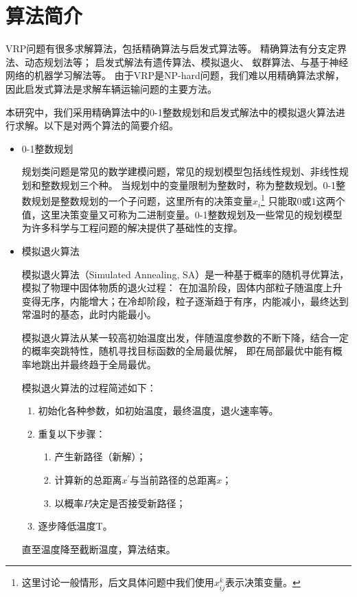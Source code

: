 \section{算法简介}
VRP问题有很多求解算法，包括精确算法与启发式算法等。
精确算法有分支定界法、动态规划法\cite{kara2003integer}等；
启发式解法有遗传算法\cite{baker2003genetic}、模拟退火\cite{vincent2017simulated}、
蚁群算法、与基于神经网络的机器学习解法\cite{bi2022learning}等。
由于VRP是NP-hard问题，我们难以用精确算法求解，因此启发式算法是求解车辆运输问题的主要方法。

本研究中，我们采用精确算法中的0-1整数规划和启发式解法中的模拟退火算法进行求解。以下是对两个算法的简要介绍。

\begin{itemize}
    \item 0-1整数规划

    规划类问题是常见的数学建模问题，常见的规划模型包括线性规划、非线性规划和整数规划三个种。
    当规划中的变量限制为整数时，称为整数规划。0-1整数规划是整数规划的一个子问题，这里所有的决策变量$x_i$\footnote{
        这里讨论一般情形，后文具体问题中我们使用$x_{ij}^{k}$表示决策变量。
    }
    只能取$0$或$1$这两个值，这里决策变量又可称为二进制变量。0-1整数规划及一些常见的规划模型为许多科学与工程问题的解决提供了基础性的支撑。
    \item 模拟退火算法

    模拟退火算法（Simulated Annealing, SA）是一种基于概率的随机寻优算法，模拟了物理中固体物质的退火过程：
    在加温阶段，固体内部粒子随温度上升变得无序，内能增大；在冷却阶段，粒子逐渐趋于有序，内能减小，最终达到常温时的基态，此时内能最小。

    模拟退火算法从某一较高初始温度出发，伴随温度参数的不断下降，结合一定的概率突跳特性，随机寻找目标函数的全局最优解，
    即在局部最优中能有概率地跳出并最终趋于全局最优。

    模拟退火算法的过程简述如下：
    
    \begin{enumerate}
        \item 初始化各种参数，如初始温度，最终温度，退火速率等。
        \item 重复以下步骤：
        \begin{enumerate}
            \item 产生新路径（新解）；
            \item 计算新的总距离$x^{\prime}$与当前路径的总距离$x$；
            \item 以概率$P$决定是否接受新路径；
        \end{enumerate}
        \item 逐步降低温度T。
    \end{enumerate}
    直至温度降至截断温度，算法结束。


\end{itemize}
